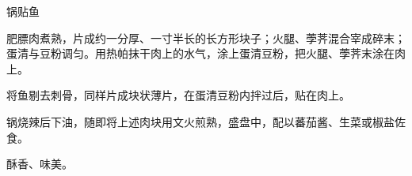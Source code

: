\begin{recipe}{锅贴鱼}

\ingredients



\cooking

肥膘肉煮熟，片成约一分厚、一寸半长的长方形块子；火腿、荸荠混合宰成碎末；蛋清与豆粉调匀。用热帕抹干肉上的水气，涂上蛋清豆粉，把火腿、荸荠末涂在肉上。

将鱼剔去刺骨，同样片成块状薄片，在蛋清豆粉内拌过后，贴在肉上。

锅烧辣后下油，随即将上述肉块用文火煎熟，盛盘中，配以蕃茄酱、生菜或椒盐佐食。

\notes

酥香、味美。

\end{recipe}


